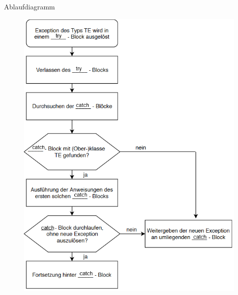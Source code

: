 \documentclass{../tuda-exercise}
\begin{document}
\begin{task}[credit=\stars{1}{3}]{Ablaufdiagramm}
    \clearpagesolution

    \begin{solution}
      \begin{figure}[h]
        \centering
        \includegraphics[width=.7\textwidth]{graphics/V4_Solution}
      \end{figure}
    \end{solution}
  \end{task}

  \clearpagesolution
\end{document}
